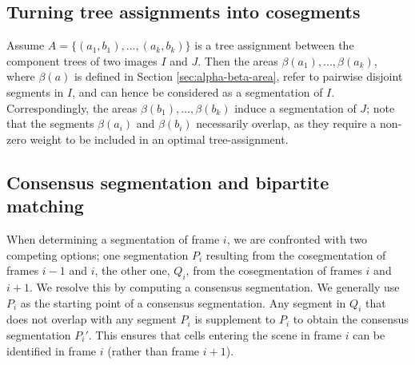 
\subsection{Turning tree assignments into cosegments}
Assume $A=\{(a_1,b_1),\ldots,(a_k,b_k)\}$ is a tree assignment between the component trees of two images $I$ and $J$. Then the areas $\beta(a_1),\ldots,\beta(a_k)$, where $\beta(a)$ is defined in Section \ref{sec:alpha-beta-area},  refer to pairwise disjoint segments in $I$, and can hence be considered as a segmentation of $I$. Correspondingly, the areas $\beta(b_1),\ldots,\beta(b_k)$ induce a segmentation of $J$; note that the segments $\beta(a_i)$ and $\beta(b_i)$ necessarily overlap, as they require a non-zero weight to be included in an optimal tree-assignment.

\subsection{Consensus segmentation and bipartite matching}
When determining a segmentation of frame $i$, we are confronted with two competing options; one segmentation $P_i$ resulting from the cosegmentation of frames $i-1$ and $i$, the other one, $Q_i$, from the cosegmentation of frames $i$ and $i+1$. We resolve this by computing a consensus segmentation. We generally use $P_i$ as the starting point of a consensus segmentation. Any segment in $Q_i$ that does not overlap with any segment $P_i$ is supplement to $P_i$ to obtain the consensus segmentation $P_i′$. This ensures that cells entering the scene in frame $i$ can be identified in frame $i$ (rather than frame $i+1$).

